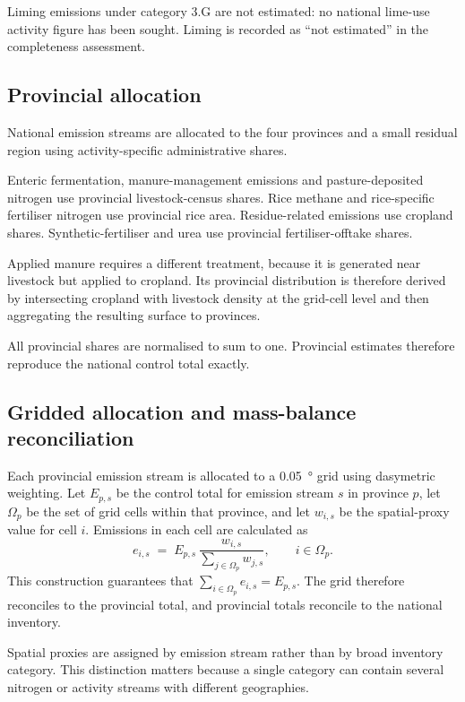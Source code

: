 Liming emissions under category 3.G are not estimated: no national lime-use activity figure
has been sought. Liming is recorded as ``not estimated'' in the completeness
assessment.

\subsection{Provincial allocation}

National emission streams are allocated to the four provinces and a small residual region
using activity-specific administrative shares.

Enteric fermentation, manure-management emissions and pasture-deposited nitrogen use
provincial livestock-census shares. Rice methane and rice-specific fertiliser nitrogen use
provincial rice area. Residue-related emissions use cropland shares. Synthetic-fertiliser
\NtwoO{} and urea \COtwo{} use provincial fertiliser-offtake shares.

Applied manure requires a different treatment, because it is generated near livestock but
applied to cropland. Its provincial distribution is therefore derived by intersecting
cropland with livestock density at the grid-cell level and then aggregating the resulting
surface to provinces.

All provincial shares are normalised to sum to one. Provincial estimates therefore reproduce
the national control total exactly.

\subsection{Gridded allocation and mass-balance reconciliation}

Each provincial emission stream is allocated to a \SI{0.05}{\degree} grid using dasymetric
weighting. Let $E_{p,s}$ be the control total for emission stream $s$ in province $p$, let
$\Omega_p$ be the set of grid cells within that province, and let $w_{i,s}$ be the
spatial-proxy value for cell $i$. Emissions in each cell are calculated as
\begin{equation}
e_{i,s} \;=\; E_{p,s}\,\frac{w_{i,s}}{\sum_{j\in\Omega_p} w_{j,s}},
\qquad i\in\Omega_p .
\label{eq:reconcile}
\end{equation}
This construction guarantees that $\sum_{i\in\Omega_p} e_{i,s}=E_{p,s}$. The grid therefore
reconciles to the provincial total, and provincial totals reconcile to the national
inventory.

Spatial proxies are assigned by emission stream rather than by broad inventory category.
This distinction matters because a single category can contain several nitrogen or activity
streams with different geographies.

